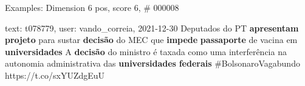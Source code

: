 \begin{frame}{Examples: Dimension 6 pos, score 6, \# 000008}
\footnotesize
\begin{exampleblock}{text: t078779, user: vando\_correia, 2021-12-30}
Deputados do PT \textbf{apresentam} \textbf{projeto} para sustar 
\textbf{decisão} do MEC que \textbf{impede} \textbf{passaporte} de vacina em 
\textbf{universidades} A \textbf{decisão} do ministro é taxada como uma 
interferência na autonomia administrativa das \textbf{universidades} 
\textbf{federais} \#BolsonaroVagabundo https://t.co/sxYUZdgEuU 
\end{exampleblock}
\end{frame}
